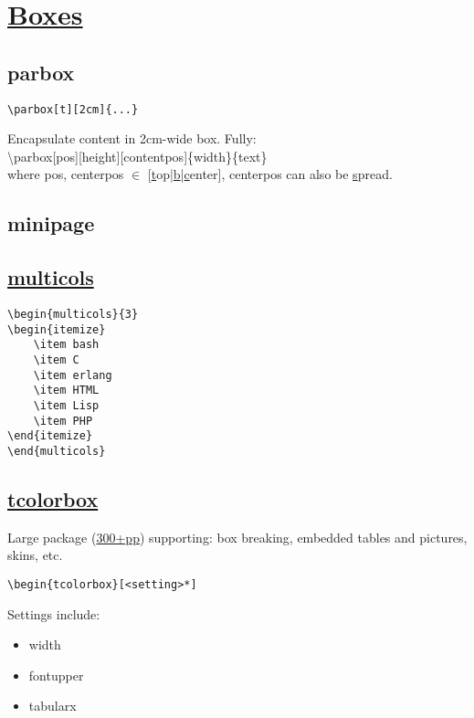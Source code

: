 \section{\href{https://en.wikibooks.org/wiki/LaTeX/Boxes}{Boxes}}

\subsection*{parbox}
\begin{lstlisting}
\parbox[t][2cm]{...}
\end{lstlisting}
Encapsulate content in 2cm-wide box. Fully:\\
\textbackslash parbox[pos][height][contentpos]\{width\}\{text\} \\
where pos, centerpos $\in$ [\underline{t}op|\underline{b}|\underline{c}enter], centerpos can also be \underline{s}pread.

\subsection*{minipage}

\subsection*{\href{http://mirrors.ctan.org/macros/latex/required/tools/multicol.pdf}{multicols}}
\begin{lstlisting}
\begin{multicols}{3}
\begin{itemize}
    \item bash
    \item C
    \item erlang
    \item HTML
    \item Lisp
    \item PHP
\end{itemize}
\end{multicols}
\end{lstlisting}


\subsection*{\href{https://www.overleaf.com/latex/examples/drawing-coloured-boxes-using-tcolorbox/pvknncpjyfbp}{tcolorbox}}
Large package (\href{http://mirrors.ctan.org/macros/latex/contrib/tcolorbox/tcolorbox.pdf}{300+pp}) supporting: box breaking, embedded tables and pictures, skins, etc. 
\begin{lstlisting}
\begin{tcolorbox}[<setting>*]
\end{lstlisting}
Settings include: 
\begin{itemize}
    \item width
    \item fontupper
    \item tabularx
\end{itemize}

\ \\ 
